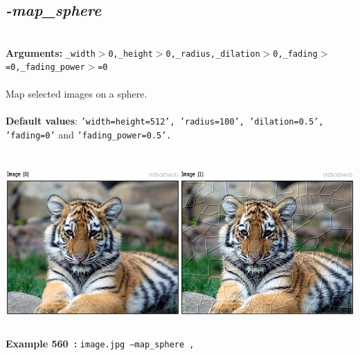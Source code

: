 \documentclass[a4paper,11pt,twoside]{book}
\begin{document}
\subsection{\emph{-map\_sphere} }\vspace*{-0.5em}
~\\\textbf{Arguments: } 
{\small \texttt{\_width$>$0,\_height$>$0,\_radius,\_dilation$>$0,\_fading$>$=0,\_fading\_power$>$=0}}\\~\\
Map selected images on a sphere.
~\\~\\\textbf{Default values}: {\small \texttt{'width=height=512', 'radius=100', 'dilation=0.5', 'fading=0'} and \texttt{'fading\_power=0.5'.}}
\begin{center}\includegraphics[keepaspectratio=true,height=7cm,width=\textwidth]{img/gmic_def560.jpg}\\
{\footnotesize \textbf{Example 560~:} \texttt{image.jpg --map\_sphere ,}}
\end{center}
\end{document}
